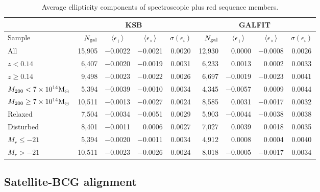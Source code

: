 {\begin{landscape}


\begin{table}\footnotesize
\begin{center}
\caption{Average ellipticity components of spectroscopic plus red sequence members.}
\label{t:shear-rs}
\begin{tabular}{l | r r r c | r r r c}
\hline\hline
 &  & \multicolumn{2}{c}{KSB} &  &  & \multicolumn{2}{c}{GALFIT} &  \\
\hline
Sample & $N_{\rm gal}$ & \multicolumn{1}{c}{$\langle \epsilon_+ \rangle$} & 
\multicolumn{1}{c}{$\langle \epsilon_\times \rangle$} & 
$\sigma(\epsilon_i)$ & $N_{\rm gal}$ & \multicolumn{1}{c}{$\langle 
\epsilon_+ \rangle$} & 
\multicolumn{1}{c}{$\langle \epsilon_\times \rangle$} & 
\multicolumn{1}{c}{$\sigma(\epsilon_i)$} \\[0.5ex]
\hline
All & 15,905 & $-$0.0022 & $-$0.0021 & 0.0020 & 12,930 & 0.0000 & $-$0.0008 & 0.0026 \\
[0.8ex]
$z<0.14$ & 6,407 & $-$0.0020 & $-$0.0019 & 0.0031 & 6,233 & 0.0013 & 0.0002 & 0.0033 \\
$z\geq0.14$ & 9,498 & $-$0.0023 & $-$0.0022 & 0.0026 & 6,697 & $-$0.0019 & $-$0.0023 & 0.0041 \\
[0.8ex]
$M_{200}<7\times10^{14}{\rm M}_\odot$ & 5,394 & $-$0.0039 & $-$0.0010 & 0.0034 & 4,345 & $-$0.0057 & 
0.0009 & 0.0044 \\
$M_{200}\geq7\times10^{14}{\rm M}_\odot$ & 10,511 & $-$0.0013 & $-$0.0027 & 0.0024 & 8,585 & 0.0031 & 
$-$0.0017 & 0.0032 \\
[0.8ex]
Relaxed & 7,504 & $-$0.0034 & $-$0.0051 & 0.0029 & 5,903 & $-$0.0044 & $-$0.0038 & 0.0038 \\
Disturbed & 8,401 & $-$0.0011 & 0.0006 & 0.0027 & 7,027 & 0.0039 & 0.0018 & 0.0035 \\
[0.8ex]
$M_r\leq-21$ & 5,394 & $-$0.0020 & $-$0.0011 & 0.0034 & 4,912 & 0.0008 & 0.0004 & 0.0040 \\
$M_r>-21$ & 10,511 & $-$0.0023 & $-$0.0026 & 0.0024 & 8,018 & $-$0.0005 & $-$0.0017 & 0.0034 \\
\hline
\end{tabular}
\end{center}
\end{table}

\end{landscape}
}

\subsection{Satellite-BCG alignment}\label{s:bcgalignment}


